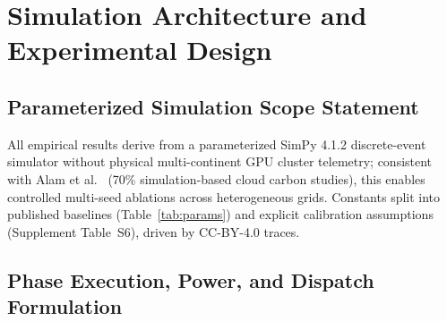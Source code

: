 \section{Simulation Architecture and Experimental Design}\label{sec:sim_design}

\subsection{Parameterized Simulation Scope Statement}\label{subsec:scope_statement}
All empirical results derive from a parameterized SimPy 4.1.2 discrete-event simulator without physical multi-continent GPU cluster telemetry; consistent with Alam et al.~\cite{alam2026computing} (70\% simulation-based cloud carbon studies), this enables controlled multi-seed ablations across heterogeneous grids. Constants split into published baselines (Table~\ref{tab:params}) and explicit calibration assumptions (Supplement Table~S6), driven by CC-BY-4.0 traces.

\subsection{Phase Execution, Power, and Dispatch Formulation}\label{subsec:sim_equations}

